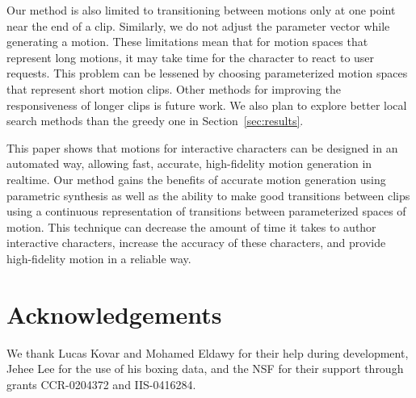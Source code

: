 \documentclass[10pt,twocolumn]{article}
\begin{document}
Our method is also limited to transitioning between motions only at one point near the end of a clip. Similarly, we do not adjust the parameter vector while generating a motion. These limitations mean that for motion spaces that represent long motions, it may take time for the character to react to user requests. This problem can be lessened by choosing parameterized motion spaces that represent short motion clips. Other methods for improving the responsiveness of longer clips is future work. We also plan to explore better local search methods than the greedy one in Section~\ref{sec:results}.

This paper shows that motions for interactive characters can be designed in an automated way, allowing fast, accurate, high-fidelity motion generation in realtime. Our method gains the benefits of accurate motion generation using parametric synthesis as well as the ability to make good transitions between clips using a continuous representation of transitions between parameterized spaces of motion. This technique can decrease the amount of time it takes to author interactive characters, increase the accuracy of these characters, and provide high-fidelity motion in a reliable way.

\section{Acknowledgements}

We thank Lucas Kovar and Mohamed Eldawy for their help during development, Jehee Lee for the use of his boxing data, and the NSF for their support through grants CCR-0204372 and IIS-0416284.
\end{document}
